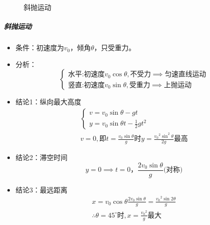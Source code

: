 \begin{figure}[ht!]
    \centering
    \caption{斜抛运动}
\end{figure}
\subparagraph{斜抛运动}
\begin{itemize}
    \item 条件：初速度为$v_0$，倾角$\theta$，只受重力。
    \item 分析：
    \begin{equation*}
        \begin{cases}
            \textrm{水平:初速度}v_0\cos\theta,\textrm{不受力}\implies\textrm{匀速直线运动}\\
            \textrm{竖直:初速度}v_0\sin\theta,\textrm{受重力}\implies\textrm{上抛运动}
        \end{cases}
    \end{equation*}
    \item 结论1：纵向最大高度
    \begin{gather*}
        \begin{cases}
            v=v_0\sin\theta-gt\\
            y=v_0\sin\theta t-\frac{1}{2}gt^2
        \end{cases}\\
        v=0,\textrm{即}t=\frac{v_0\sin{\theta}}{g}\textrm{时}
        y=\frac{{v_0}^2\sin^2{\theta}}{2g}\textrm{最高}
    \end{gather*}
    \item 结论2：滞空时间
    \begin{equation*}
        y=0\implies t=0，\frac{2v_0\sin{\theta}}{g}\textrm{(对称)}
    \end{equation*}
    \item 结论3：最远距离
    \begin{gather*}
        x=v_0\cos{\theta}\frac{2v_0\sin\theta}{g}=\frac{{v_0}^2\sin{2\theta}}{g}\\
        \therefore\theta=45^\circ\textrm{时},x=\frac{{v_0}^2}{g}\textrm{最大}
        \end{gather*}
\end{itemize}


